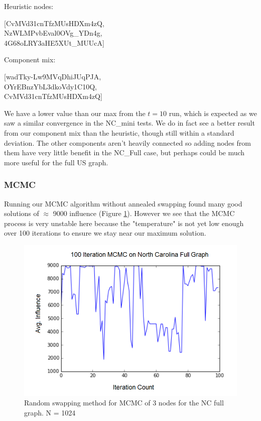 \documentclass{article}
\begin{document}
	Heuristic nodes: 
	\begin{center}
		[CvMVd31cnTfzMUsHDXm4zQ, \\
		NzWLMPvbEval0OVg\_YDn4g,\\
		4G68oLRY3aHE5XUt\_MUUcA]\\
	\end{center}
	
	Component mix: 
	\begin{center}
		[wadTky-Lw9MVqDhiJUqPJA,\\
		OYrEBnzYbL3dkoVdy1C10Q,\\
		CvMVd31cnTfzMUsHDXm4zQ]\\
	\end{center}
	
	We have a lower value than our max from the $t=10$ run, which is expected as we saw a similar convergence in the NC\_mini tests. We do in fact see a better result from our component mix than the heuristic, though still within a standard deviation. The other components aren't heavily connected so adding nodes from them have very little benefit in the NC\_Full case, but perhaps could be much more useful for the full US graph.
	
	
	\subsubsection{MCMC}
	
	
	Running our MCMC algorithm without annealed swapping found many good solutions of $\approx$ 9000 influence (Figure \ref{fig:mcmc_noswap}). However we see that the MCMC process is very unstable here because the "temperature" is not yet low enough over 100 iterations to ensure we stay near our maximum solution.
	
			\begin{figure}[h!]
				\centering
				\includegraphics[scale=0.7]{nc_full_mcmc.png}
				\caption{Random swapping method for MCMC of 3 nodes for the NC full graph. N = 1024}
				\label{fig:mcmc_noswap}
			\end{figure}
			
\end{document}
